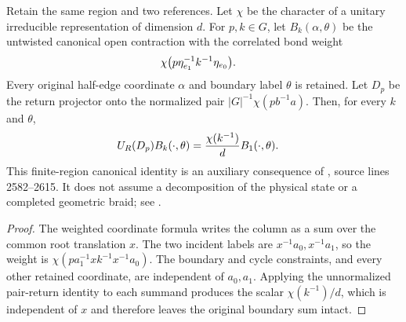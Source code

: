 \begin{lemma}
    \label{thm:peps_reference_return_actual_column}
    \leanok
    Retain the same region and two references. Let $\chi$ be the character
    of a unitary irreducible representation of dimension $d$. For $p,k\in G$,
    let $B_k(\alpha,\theta)$ be the untwisted canonical open contraction
    with the correlated bond weight
    \begin{align}
         & \chi\bigl(p\eta_{e_1}^{-1}k^{-1}\eta_{e_0}\bigr).\notag
    \end{align}
    Every original half-edge coordinate $\alpha$ and boundary label $\theta$
    is retained. Let $D_p$ be the return projector onto the normalized pair
    $|G|^{-1}\chi(pb^{-1}a)$. Then, for every $k$ and $\theta$,
    \begin{align}
        U_R(D_p)B_k(\cdot,\theta)
         & =\frac{\chi(k^{-1})}{d}B_1(\cdot,\theta).\notag
    \end{align}
    This finite-region canonical identity is an auxiliary consequence of
    \cite[Section~6.6]{Schuch2010PEPS}, source lines 2582--2615. It does not
    assume a decomposition of the physical state or a completed geometric braid; see
    \cite{gap:rmp_peps_quantum_double_g_isometry}.
\end{lemma}
\begin{proof}
    \leanok
    The weighted coordinate formula writes the column as a sum over
    the common root translation $x$. The two incident labels are
    $x^{-1}a_0,x^{-1}a_1$, so the weight is
    $\chi(pa_1^{-1}xk^{-1}x^{-1}a_0)$. The boundary and cycle constraints,
    and every other retained coordinate, are independent of $a_0,a_1$.
    Applying the unnormalized pair-return identity to each summand produces
    the scalar $\chi(k^{-1})/d$, which is independent of $x$ and therefore
    leaves the original boundary sum intact.
\end{proof}
